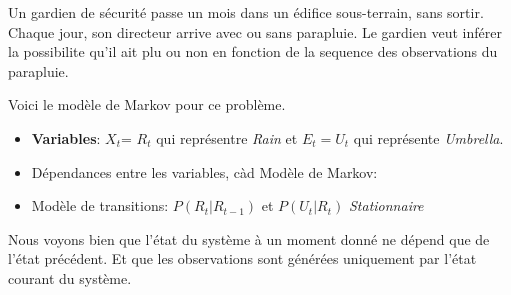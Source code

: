 \begin{example}\leavevmode
    Un gardien de sécurité passe un mois dans un édifice sous-terrain, sans sortir. Chaque
    jour, son directeur arrive avec ou sans parapluie. Le gardien veut inférer la possibilite
    qu'il ait plu ou non en fonction de la sequence des observations du parapluie.

    Voici le modèle de Markov pour ce problème. 
    \begin{itemize}
        \item \textbf{Variables}: $X_t$= {$R_t$} qui représentre \textit{Rain} et $E_t = {U_t}$ qui représente \textit{Umbrella}.
        \item Dépendances entre les variables, càd Modèle de Markov:
            \begin{figure}[H]
                \centering
            \end{figure}
        \item Modèle de transitions: $P(R_t | R_{t-1})$ et $P(U_t | R_t)$ \textit{Stationnaire}
    \end{itemize}
    Nous voyons bien que l'état du système à un moment donné ne dépend que de l'état précédent. 
    Et que les observations sont générées uniquement par l'état courant du système.

\end{example}


